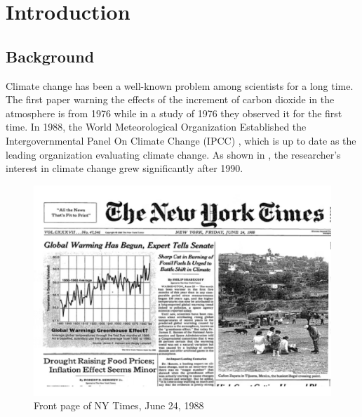 
\chapter{Introduction}  %
\label{Introduction}

\ifpdf
    \graphicspath{{Chapter1/Figs/Raster/}{Chapter1/Figs/PDF/}{Chapter1/Figs/}}
\else
    \graphicspath{{Chapter1/Figs/Vector/}{Chapter1/Figs/}}
\fi
\section{Background}
Climate change has been a well-known problem among scientists for a long time. The first paper warning the effects of the increment of carbon dioxide in the atmosphere is from 1976 \cite{manabe_thermal_1967} while in a study of 1976 \cite{keeling_atmospheric_1976} they observed it for the first time. In 1988, the World Meteorological Organization Established the Intergovernmental Panel On Climate Change (IPCC) \cite{baker_1989}, which is up to date as the leading organization evaluating climate change. As shown in \cite{santos_climate_2021}, the researcher's interest in climate change grew significantly after 1990. 

\begin{figure}[H]
    \centering
    \includegraphics[width=0.75\linewidth]{Chapter1/figures/global_warming copy.pdf}
    \caption{Front page of NY Times, June 24, 1988 }
    \label{fig:enter-label}
\end{figure}

